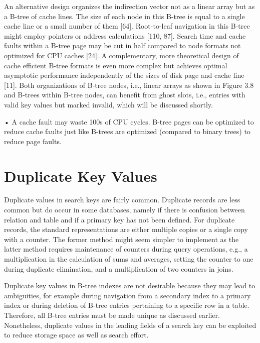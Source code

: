 An alternative design organizes the indirection vector not as a linear
array but as a B-tree of cache lines. The size of each node in this
B-tree is equal to a single cache line or a small number of them
{[}64{]}. Root-to-leaf navigation in this B-tree might employ pointers
or address calculations {[}110, 87{]}. Search time and cache faults
within a B-tree page may be cut in half compared to node formats not
optimized for CPU caches {[}24{]}. A complementary, more theoretical
design of cache efficient B-tree formats is even more complex but
achieves optimal asymptotic performance independently of the sizes of
disk page and cache line {[}11{]}. Both organizations of B-tree nodes,
i.e., linear arrays as shown in Figure 3.8 and B-trees within B-tree
nodes, can benefit from ghost slots, i.e., entries with valid key values
but marked invalid, which will be discussed shortly.

• A cache fault may waste 100s of CPU cycles. B-tree pages can be
optimized to reduce cache faults just like B-trees are optimized
(compared to binary trees) to reduce page faults.

\hypertarget{duplicate-key-values}{%
\section{Duplicate Key Values}\label{duplicate-key-values}}

Duplicate values in search keys are fairly common. Duplicate records are
less common but do occur in some databases, namely if there is confusion
between relation and table and if a primary key has not been defined.
For duplicate records, the standard representations are either multiple
copies or a single copy with a counter. The former method might seem
simpler to implement as the latter method requires maintenance of
counters during query operations, e.g., a multiplication in the
calculation of sums and averages, setting the counter to one during
duplicate elimination, and a multiplication of two counters in joins.

Duplicate key values in B-tree indexes are not desirable because they
may lead to ambiguities, for example during navigation from a secondary
index to a primary index or during deletion of B-tree entries pertaining
to a specific row in a table. Therefore, all B-tree entries must be made
unique as discussed earlier. Nonetheless, duplicate values in the
leading fields of a search key can be exploited to reduce storage space
as well as search effort.

